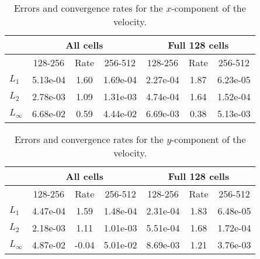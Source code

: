 
\begin{table}[htbp]
\begin{center}
\begin{tabular}{||l|c|c|c||c|c|c||} \hline
           & \multicolumn{3}{c||}{All cells} & \multicolumn{3}{c||}{Full 128 cells} \\ \hline
           & 128-256  & Rate & 256-512  & 128-256  & Rate & 256-512  \\ \hline
$L_1$      & 5.13e-04 & 1.60 & 1.69e-04 & 2.27e-04 & 1.87 & 6.23e-05 \\
$L_2$      & 2.78e-03 & 1.09 & 1.31e-03 & 4.74e-04 & 1.64 & 1.52e-04 \\
$L_\infty$ & 6.68e-02 & 0.59 & 4.44e-02 & 6.69e-03 & 0.38 & 5.13e-03 \\ \hline
\end{tabular}
\end{center}
\caption{Errors and convergence rates for the $x$-component of the velocity.}
\end{table}

\begin{table}[htbp]
\begin{center}
\begin{tabular}{||l|c|c|c||c|c|c||} \hline
           & \multicolumn{3}{c||}{All cells} & \multicolumn{3}{c||}{Full 128 cells} \\ \hline
           & 128-256  & Rate & 256-512  & 128-256  & Rate & 256-512  \\ \hline
$L_1$      & 4.47e-04 & 1.59 & 1.48e-04 & 2.31e-04 & 1.83 & 6.48e-05 \\
$L_2$      & 2.18e-03 & 1.11 & 1.01e-03 & 5.51e-04 & 1.68 & 1.72e-04 \\
$L_\infty$ & 4.87e-02 & -0.04 & 5.01e-02 & 8.69e-03 & 1.21 & 3.76e-03 \\ \hline
\end{tabular}
\end{center}
\caption{Errors and convergence rates for the $y$-component of the velocity.}
\end{table}

